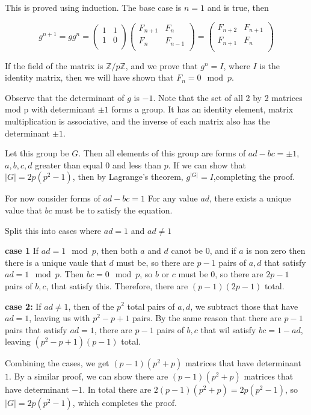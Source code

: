 \documentclass{article}
\begin{document}
This is proved using induction.  The base case is $n = 1$ and is true, then 

\[
g^{n + 1} = g g^n = \begin{pmatrix}
1 & 1 \\
1 & 0 \\
\end{pmatrix}
\begin{pmatrix}
F_{n + 1} & F_{n} \\
F_n & F_{n - 1} \\
\end{pmatrix} = 
\begin{pmatrix}
F_{n + 2}  & F_{n + 1} \\
F_{n + 1} & F_n \\
\end{pmatrix}
\]

If the field of the matrix is $\mathbb{Z} / p \mathbb{Z}$, and we prove
that $g^n = I$, where $I$ is the identity matrix, then we will have shown that
$F_n = 0 \mod p$.


Observe that the determinant of $g$  is $-1$. Note that the set of all 2 by 2 matrices 
mod p
with determinant $\pm 1$ forms a group. It has an identity element,
matrix multiplication is associative, and the inverse of each matrix 
also has the determinant $\pm 1$.  

Let this group be $G$.  Then all elements of this group are forms of $ad - bc = \pm 1$,
$a, b, c, d $ greater than equal $0$ and  less than $p$. If we can show that 
$|G| = 2p(p^2 - 1)$, then by Lagrange's theorem, $g^{|G|} = I$,completing the proof.


For now consider forms of $ad - bc = 1$
For any value $ad$, there exists a unique value that $bc$ must be to
satisfy the equation.

Split this into cases where $ad = 1$ and $ad \ne 1$

\textbf{case 1}
If $ad = 1 \mod p$, then both $a$ and $d$ canot be $0$, and if $a$ is non zero
then there is a unique vaule that $d$ must be, so there are $p - 1$ pairs of $a, d$
that satisfy $ad = 1 \mod p$.  Then $bc = 0 \mod p$, so $b$ or $c$ must be $0$, so
there are $2p - 1$ pairs of $b, c$, that satisfy this.  Therefore, there are
$(p - 1)(2p - 1)$ total.

\textbf{case 2:}
If $ad \ne 1$, then of the $p^2$ total pairs of $a, d$, we subtract those that have
$ad = 1$, leaving us with $p^2 - p + 1$ pairs.  By the same reason that 
there are $p - 1$ pairs that satisfy $ad = 1$, there are $p -1$ pairs of $b, c$ 
that wil satisfy $bc = 1 - ad$, leaving $(p^2 - p + 1)(p - 1)$ total.

Combining the cases, we get $(p - 1)(p^2 + p)$ matrices that have determinant $1$.
By a similar proof, we can show there are $(p - 1)(p^2 + p)$ matrices that have
determinant $-1$.  In total there are $2(p-1)(p^2 + p) = 2p(p^2 - 1)$, so 
$|G| = 2p(p^2 - 1)$, which completes the proof.
\end{document}
